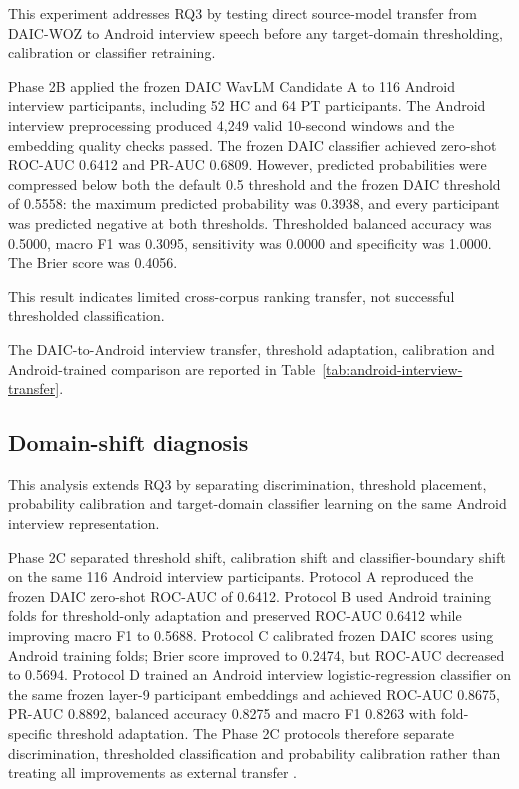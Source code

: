\documentclass[lettersize,journal]{IEEEtran}
\begin{document}
This experiment addresses RQ3 by testing direct source-model transfer from DAIC-WOZ to Android interview speech before any target-domain thresholding, calibration or classifier retraining.

Phase 2B applied the frozen DAIC WavLM Candidate A to 116 Android interview participants, including 52 HC and 64 PT participants. The Android interview preprocessing produced 4,249 valid 10-second windows and the embedding quality checks passed. The frozen DAIC classifier achieved zero-shot ROC-AUC 0.6412 and PR-AUC 0.6809. However, predicted probabilities were compressed below both the default 0.5 threshold and the frozen DAIC threshold of 0.5558: the maximum predicted probability was 0.3938, and every participant was predicted negative at both thresholds. Thresholded balanced accuracy was 0.5000, macro F1 was 0.3095, sensitivity was 0.0000 and specificity was 1.0000. The Brier score was 0.4056.

This result indicates limited cross-corpus ranking transfer, not successful thresholded classification.

The DAIC-to-Android interview transfer, threshold adaptation, calibration and Android-trained comparison are reported in Table~\ref{tab:android-interview-transfer}.



\subsection{Domain-shift diagnosis}

This analysis extends RQ3 by separating discrimination, threshold placement, probability calibration and target-domain classifier learning on the same Android interview representation.

Phase 2C separated threshold shift, calibration shift and classifier-boundary shift on the same 116 Android interview participants. Protocol A reproduced the frozen DAIC zero-shot ROC-AUC of 0.6412. Protocol B used Android training folds for threshold-only adaptation and preserved ROC-AUC 0.6412 while improving macro F1 to 0.5688. Protocol C calibrated frozen DAIC scores using Android training folds; Brier score improved to 0.2474, but ROC-AUC decreased to 0.5694. Protocol D trained an Android interview logistic-regression classifier on the same frozen layer-9 participant embeddings and achieved ROC-AUC 0.8675, PR-AUC 0.8892, balanced accuracy 0.8275 and macro F1 0.8263 with fold-specific threshold adaptation. The Phase 2C protocols therefore separate discrimination, thresholded classification and probability calibration rather than treating all improvements as external transfer \cite{niculescuMizil2005probabilities,vanCalster2019calibration}.
\end{document}
